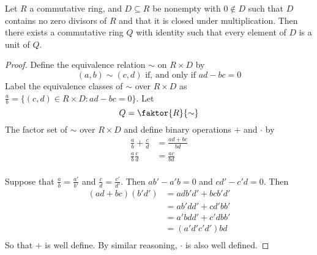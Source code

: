 \begin{theorem}\label{theorem_5.6.2}
  Let $R$ a commutative ring, and  $D \subseteq R$ be nonempty with $0 \notin
  D$ such that $D$ contains no zero divisors of $R$ and that it is closed
  under multiplication. Then there exists a commutative ring $Q$ with identity
  such that  every element of  $D$ is a unit of $Q$.
\end{theorem}
\begin{proof}
  Define the equivalence relation $\sim$ on  $R \times D$ by
  \begin{equation*}
    (a,b) \sim (c,d) \text{ if, and only if } ad-bc=0
  \end{equation*}
  Label the equivalence classes of $\sim$ over $R \times D$ as
  $\frac{a}{b}=\{(c,d) \in R \times D : ad-bc=0\}$. Let
  \begin{equation*}
    Q=\faktor{R}{\sim}
  \end{equation*}
  The factor set of $\sim$ over $R \times D$ and define binary operations $+$
  and  $\cdot$ by
  \begin{align*}
    \frac{a}{b}+\frac{c}{d}     &=  \frac{ad+bc}{bd}    \\
    \frac{a}{b}\frac{c}{d}     &=  \frac{ac}{bd}    \\
  \end{align*}

  Suppose that $\frac{a}{b}=\frac{a'}{b'}$ and $\frac{c}{d}=\frac{c'}{d'}$.
  Then $ab'-a'b=0$ and  $cd'-c'd=0$. Then
  \begin{align*}
    (ad+bc)(b'd')       &=  adb'd'+bcb'd'  \\
                        &=  ab'dd'+cd'bb'   \\
                        &=  a'bdd'+c'dbb'   \\
                        &=  (a'd'c'd')bd    \\
  \end{align*}
  So that $+$ is well define. By similar reasoning,  $\cdot$ is also well
  defined.


\end{proof}
